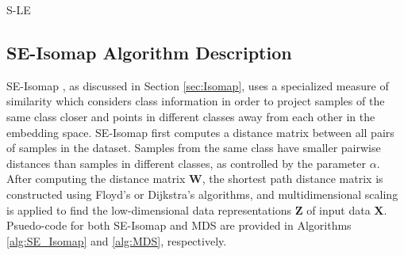 \begin{algorithm}[h!]
	\caption{S-LE}
	\label{alg:SLE}
	\begin{algorithmic}[1]
		\Else
		\EndIf
		\EndFor
	\end{algorithmic}
\end{algorithm}

\subsection{SE-Isomap Algorithm Description}
SE-Isomap \citep{Ribeiro2008SupervisedIsomap}, as discussed in Section \ref{sec:Isomap}, uses a specialized measure of similarity which considers class information in order to project samples of the same class closer and points in different classes away from each other in the embedding space. SE-Isomap first computes a distance matrix between all pairs of samples in the dataset.  Samples from the same class have smaller pairwise distances than samples in different classes, as controlled by the parameter $\alpha$.  After computing the distance matrix $\bm{W}$, the shortest path distance matrix is constructed using Floyd's or Dijkstra's algorithms, and multidimensional  scaling is applied to find the low-dimensional data representations $\bm{Z}$ of input data $\bm{X}$. Psuedo-code for both SE-Isomap and MDS are provided in Algorithms \ref{alg:SE_Isomap} and \ref{alg:MDS}, respectively.

